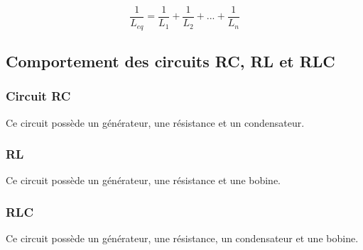 \documentclass[a4paper,10pt]{article}
\begin{document}
$$\frac{1}{L_{eq}}=\frac{1}{L_1}+\frac{1}{L_2}+...+\frac{1}{L_n}$$



\subsection{Comportement des circuits RC, RL et RLC}

\subsubsection{Circuit RC}
Ce circuit possède un générateur, une résistance et un condensateur.
\subsubsection{RL}
Ce circuit possède un générateur, une résistance et une bobine.
\subsubsection{RLC}
Ce circuit possède un générateur, une résistance, un condensateur et une bobine.
\end{document}
